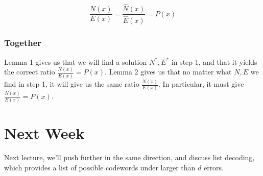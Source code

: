 \documentclass{idc_msc}
\begin{document}
\[\frac{N(x)}{E(x)} = \frac{\hat{N}(x)}{\hat{E}(x)} = P(x)\]

\subsubsection{Together}

Lemma 1 gives us that we will find a solution \(N^*, E^*\) in step 1, and that it yields the correct ratio \(\frac{N(x)}{E(x)} = P(x)\).
Lemma 2 gives us that no matter what \(N, E\) we find in step 1, it will give us the same ratio \(\frac{N(x)}{E(x)}\).
In particular, it must give \(\frac{N(x)}{E(x)} = P(x)\).

\section{Next Week}

Next lecture, we'll push further in the same direction, and discuss list decoding, which provides a list of possible codewords under larger than \(d\) errors.
\end{document}
